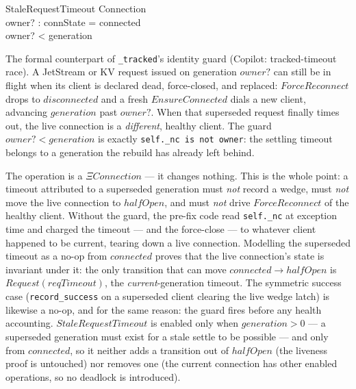 \documentclass[a4paper,10pt,fleqn]{article}
\begin{document}
\begin{schema}{StaleRequestTimeout}
  \Xi Connection \\
  owner? : \nat
  \where
  connState = connected \\
  owner? < generation
\end{schema}

The formal counterpart of \texttt{\_tracked}'s identity guard
(Copilot: tracked-timeout race).  A JetStream or KV request issued
on generation $owner?$ can still be in flight when its client is
declared dead, force-closed, and replaced: $ForceReconnect$ drops
to $disconnected$ and a fresh $EnsureConnected$ dials a new client,
advancing $generation$ past $owner?$.  When that superseded request
finally times out, the live connection is a \emph{different},
healthy client.  The guard $owner? < generation$ is exactly
\texttt{self.\_nc is not owner}: the settling timeout belongs to a
generation the rebuild has already left behind.

The operation is a $\Xi Connection$ --- it changes nothing.  This
is the whole point: a timeout attributed to a superseded generation
must \emph{not} record a wedge, must \emph{not} move the live
connection to $halfOpen$, and must \emph{not} drive
$ForceReconnect$ of the healthy client.  Without the guard, the
pre-fix code read \texttt{self.\_nc} at exception time and charged
the timeout --- and the force-close --- to whatever client happened
to be current, tearing down a live connection.  Modelling the
superseded timeout as a no-op from $connected$ proves that the live
connection's state is invariant under it: the only transition that
can move $connected \to halfOpen$ is $Request(reqTimeout)$, the
\emph{current}-generation timeout.  The symmetric success case
(\texttt{record\_success} on a superseded client clearing the live
wedge latch) is likewise a no-op, and for the same reason: the
guard fires before any health accounting.  $StaleRequestTimeout$
is enabled only when $generation > 0$ --- a superseded generation
must exist for a stale settle to be possible --- and only from
$connected$, so it neither adds a transition out of $halfOpen$
(the liveness proof is untouched) nor removes one (the current
connection has other enabled operations, so no deadlock is
introduced).
\end{document}
